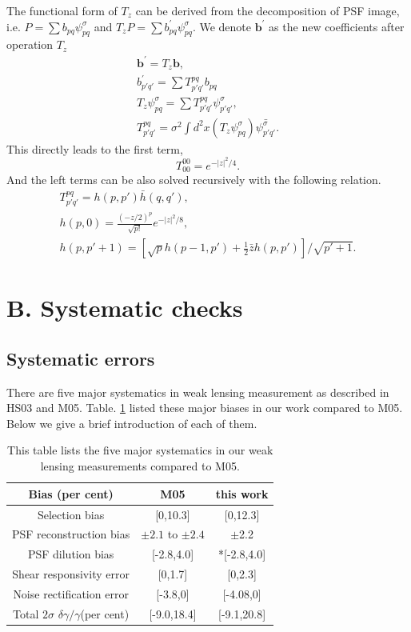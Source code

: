 \documentclass[apj]{emulateapj}
\begin{document}
The functional form of $T_z$ can be derived from the decomposition of
PSF image, i.e. $P=\sum b_{pq}\psi_{pq}^{\sigma}$ and 
$T_{z}P=\sum b_{pq}^{'}\psi_{pq}^{\sigma}$. We denote $\textbf{b}^{'}$ as the new coefficients
after operation $T_z$
\begin{gather}
\textbf{b}^{'}=T_z\textbf{b},\\
b_{p'q'}^{'}=\sum T_{p'q'}^{pq}b_{pq}\\
T_z\psi_{pq}^{\sigma}=\sum T_{p'q'}^{pq}\psi_{p'q'}^{\sigma},\\
T_{p'q'}^{pq}=\sigma^{2}\int d^2x(T_{z}\psi_{pq}^{\sigma})\bar{\psi_{p'q'}^{\sigma}}.
\end{gather}
This directly leads to the first term,
\begin{equation}
T_{00}^{00}=e^{-|z|^2/4}.
\end{equation}
And the left terms can be also solved recursively with the following relation.
\begin{gather}
T_{p'q'}^{pq}=h(p,p')\bar{h}(q,q'),\\
h(p,0)=\frac{(-z/2)^p}{\sqrt{p!}}e^{-|z|^2/8},\\
h(p,p'+1)=[\sqrt{p}h(p-1,p')+\frac{1}{2}\bar{z}h(p,p')]/\sqrt{p'+1}.
\end{gather}


\section{B. Systematic checks}
\label{sec_systematic}

\subsection{Systematic errors}

There are five major systematics in weak lensing measurement as
described in HS03 and M05. Table. \ref{tab:tbl-2} listed these major
biases in our work compared to M05. Below we give a brief
introduction of each of them.


\begin{table}[h!]
\begin{center}
  \caption{\label{tab:tbl-2} This table lists the five major
    systematics in our weak lensing measurements compared to M05. }
\begin{tabular}{ccc}
\hline
Bias (per cent) & M05 & this work\\
\hline
Selection bias            & [0,10.3]               & [0,12.3] \\
PSF reconstruction bias   & $\pm 2.1$ to $\pm 2.4$ & $\pm $2.2 \\
PSF dilution bias         & [-2.8,4.0]             & *[-2.8,4.0] \\
Shear responsivity error  & [0,1.7]                & [0,2.3]\\
Noise rectification error & [-3.8,0]               & [-4.08,0] \\
Total $2\sigma$ $\delta \gamma/\gamma$(per cent) & [-9.0,18.4] & [-9.1,20.8]\\
\hline
\end{tabular}
\end{center}
\end{table}
\end{document}
